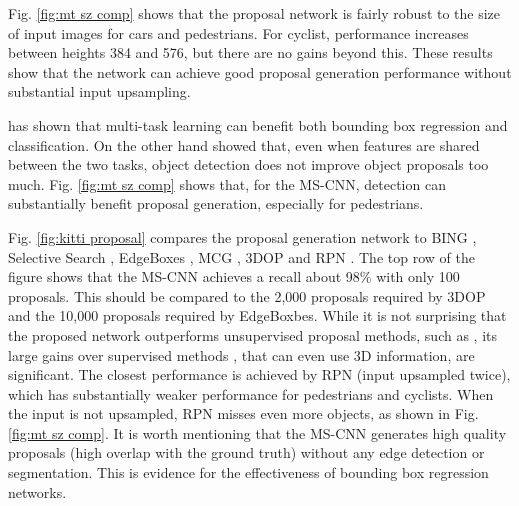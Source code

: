 \documentclass[runningheads]{llncs}
\begin{document}
Fig. \ref{fig:mt sz comp} shows that the proposal network is fairly robust
to the size of input images for cars and pedestrians. For cyclist,
performance increases between heights 384 and 576, but there are no gains
beyond this. These results show that the network can achieve good proposal
generation performance without substantial input upsampling.

\cite{DBLP:conf/iccv/Girshick15} has shown that multi-task learning
can benefit both bounding box regression and classification. On the other
hand \cite{DBLP:conf/nips/shaoqing15fasterRcnn} showed that,
even when features are shared between the two tasks,
object detection does not improve object proposals too much.
Fig. \ref{fig:mt sz comp} shows that, for the MS-CNN, detection
can substantially benefit proposal generation, especially for pedestrians.

Fig. \ref{fig:kitti proposal} compares the proposal generation network
to BING \cite{DBLP:conf/cvpr/ChengZLT14}, Selective
Search \cite{DBLP:conf/iccv/SandeUGS11},
EdgeBoxes \cite{DBLP:conf/eccv/ZitnickD14},
MCG \cite{DBLP:conf/cvpr/ArbelaezPBMM14},
3DOP \cite{DBLP:conf/nips/XiaozhiNIPS15} and
RPN \cite{DBLP:conf/nips/shaoqing15fasterRcnn}. The top row of the
figure shows that the MS-CNN achieves a recall about 98\%
with only 100 proposals. This should be compared to the 2,000 proposals
required by 3DOP and the 10,000 proposals required by EdgeBoxbes.
While it is not surprising that the proposed network outperforms
unsupervised proposal methods, such
as \cite{DBLP:conf/iccv/SandeUGS11,DBLP:conf/eccv/ZitnickD14,DBLP:conf/cvpr/ArbelaezPBMM14}, its large gains over supervised
methods \cite{DBLP:conf/cvpr/ChengZLT14,DBLP:conf/nips/XiaozhiNIPS15},
that can even use 3D information, are significant. The closest
performance is achieved by RPN (input upsampled twice), which has
substantially weaker performance for pedestrians and cyclists.
When the input is not upsampled, RPN misses even more objects, as shown in
Fig. \ref{fig:mt sz comp}. It is worth mentioning that the MS-CNN generates
high quality proposals (high overlap with the ground truth)
without any edge detection or segmentation. This is
evidence for the effectiveness of bounding box regression networks.
\end{document}
